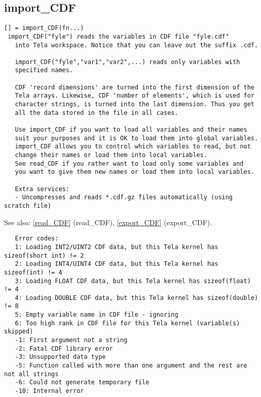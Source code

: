 \documentclass[a4paper]{article}
\begin{document}
\subsection{import\_CDF\label{import_CDF}}

\begin{tscreen}
\begin{verbatim}
[] = import_CDF(fn...)
 import_CDF("fyle") reads the variables in CDF file "fyle.cdf"
   into Tela workspace. Notice that you can leave out the suffix .cdf.

   import_CDF("fyle","var1","var2",...) reads only variables with
   specified names.

   CDF 'record dimensions' are turned into the first dimension of the
   Tela arrays. Likewise, CDF 'number of elements', which is used for
   character strings, is turned into the last dimension. Thus you get
   all the data stored in the file in all cases.
   
   Use import_CDF if you want to load all variables and their names
   suit your purposes and it is OK to load them into global variables.
   import_CDF allows you to control which variables to read, but not
   change their names or load them into local variables.
   See read_CDF if you rather want to load only some variables and
   you want to give them new names or load them into local variables.
   
   Extra services:
   - Uncompresses and reads *.cdf.gz files automatically (using scratch file)
\end{verbatim}

See also: \ref{read_CDF} {(read\_CDF)}, \ref{export_CDF} {(export\_CDF)}.
\begin{verbatim}
   Error codes:
   1: Loading INT2/UINT2 CDF data, but this Tela kernel has sizeof(short int) != 2
   2: Loading INT4/UINT4 CDF data, but this Tela kernel has sizeof(int) != 4
   3: Loading FLOAT CDF data, but this Tela kernel has sizeof(float) != 4
   4: Loading DOUBLE CDF data, but this Tela kernel has sizeof(double) != 8
   5: Empty variable name in CDF file - ignoring
   6: Too high rank in CDF file for this Tela kernel (variable(s) skipped)
   -1: First argument not a string
   -2: Fatal CDF library error
   -3: Unsupported data type
   -5: Function called with more than one argument and the rest are not all strings
   -6: Could not generate temporary file
   -10: Internal error
\end{verbatim}
\end{tscreen}
\end{document}
